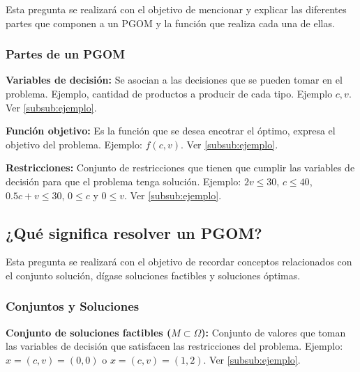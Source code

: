 \documentclass[a4paper,10pt,twocolumn]{article}
\theoremstyle{theorem}
\theoremstyle{definition}
\theoremstyle{remark}
\begin{document}
Esta pregunta se realizará con el objetivo de mencionar y explicar las diferentes partes que componen a un PGOM y la función que realiza cada una de ellas.

		\subsubsection{Partes de un PGOM}\label{subsub:partes}

\textbf{Variables de decisión:} Se asocian a las decisiones que se pueden tomar en el problema. Ejemplo, cantidad de productos a producir de cada tipo. Ejemplo $c,v$. Ver \ref{subsub:ejemplo}.  

\textbf{Función objetivo:} Es la función que se desea encotrar el óptimo, expresa el objetivo del problema. Ejemplo: $f(c, v)$. Ver \ref{subsub:ejemplo}.

\textbf{Restricciones:} Conjunto de restricciones que tienen que cumplir las variables de decisión para que el problema tenga solución. Ejemplo: $ 2 v \le 30$, $c \le 40$, $0.5 c + v \le 30 $, $0 \le c$ y $0 \le v$. Ver \ref{subsub:ejemplo}.

	\subsection{¿Qué significa resolver un PGOM?}\label{sub:results}

Esta pregunta se realizará con el objetivo de recordar conceptos relacionados con el conjunto solución, dígase soluciones factibles y soluciones óptimas.

		\subsubsection{Conjuntos y Soluciones}\label{subsub:solucion}

\textbf{Conjunto de soluciones factibles ($M \subset \Omega$):} Conjunto de valores que toman las variables de decisión que satisfacen las restricciones del problema. Ejemplo: $x = (c, v) = (0, 0)$ o $x = (c, v) = (1, 2)$. Ver \ref{subsub:ejemplo}.
\end{document}

